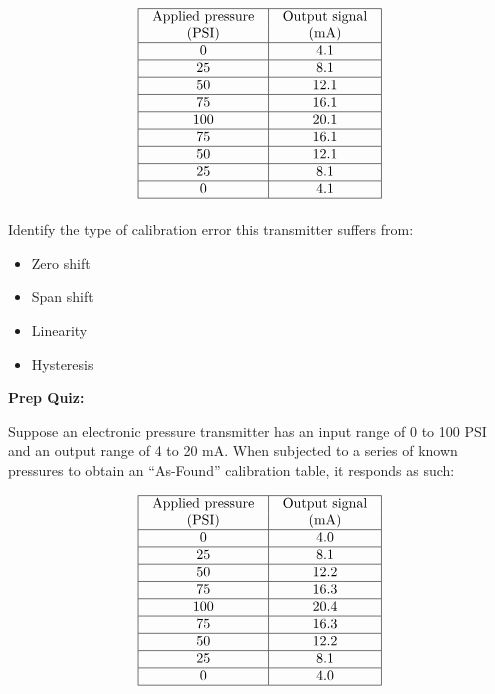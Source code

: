 \documentclass[12pt,a4paper]{article}
\begin{document}
$$\vbox{\offinterlineskip
\halign{\strut
\vrule \quad\hfil # \ \hfil & 
\vrule \quad\hfil # \ \hfil \vrule \cr
\noalign{\hrule}
%
Applied pressure & Output signal \cr
%
(PSI) & (mA) \cr
%
\noalign{\hrule}
%
0 & 4.1 \cr
%
\noalign{\hrule}
%
25 & 8.1 \cr
%
\noalign{\hrule}
%
50 & 12.1 \cr
%
\noalign{\hrule}
%
75 & 16.1 \cr
%
\noalign{\hrule}
%
100 & 20.1 \cr
%
\noalign{\hrule}
%
75 & 16.1 \cr
%
\noalign{\hrule}
%
50 & 12.1 \cr
%
\noalign{\hrule}
%
25 & 8.1 \cr
%
\noalign{\hrule}
%
0 & 4.1 \cr
%
\noalign{\hrule}
} %
}$$ %

\vskip 10pt

Identify the type of calibration error this transmitter suffers from:

\begin{itemize}
\item{} Zero shift
\vskip 5pt 
\item{} Span shift
\vskip 5pt 
\item{} Linearity
\vskip 5pt 
\item{} Hysteresis
\end{itemize}


\vfil \eject

\noindent
{\bf Prep Quiz:}

Suppose an electronic pressure transmitter has an input range of 0 to 100 PSI and an output range of 4 to 20 mA.  When subjected to a series of known pressures to obtain an ``As-Found'' calibration table, it responds as such:


$$\vbox{\offinterlineskip
\halign{\strut
\vrule \quad\hfil # \ \hfil & 
\vrule \quad\hfil # \ \hfil \vrule \cr
\noalign{\hrule}
%
Applied pressure & Output signal \cr
%
(PSI) & (mA) \cr
%
\noalign{\hrule}
%
0 & 4.0 \cr
%
\noalign{\hrule}
%
25 & 8.1 \cr
%
\noalign{\hrule}
%
50 & 12.2 \cr
%
\noalign{\hrule}
%
75 & 16.3 \cr
%
\noalign{\hrule}
%
100 & 20.4 \cr
%
\noalign{\hrule}
%
75 & 16.3 \cr
%
\noalign{\hrule}
%
50 & 12.2 \cr
%
\noalign{\hrule}
%
25 & 8.1 \cr
%
\noalign{\hrule}
%
0 & 4.0 \cr
%
\noalign{\hrule}
} %
}$$ %
\end{document}
